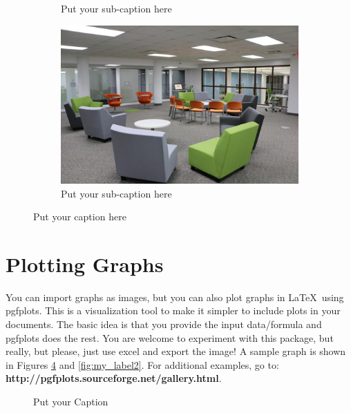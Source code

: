 \begin{figure}[ht]
\begin{subfigure}{.5\textwidth}
  \caption{Put your sub-caption here}
  \label{fig:sub-thirdthird}
\end{subfigure}
\begin{subfigure}{.5\textwidth}
  \centering
  \includegraphics[width=.8\linewidth]{images/2}  
  \caption{Put your sub-caption here}
  \label{fig:sub-fourthfourth}
\end{subfigure}
\caption{Put your caption here}
\label{fig:fig}
\end{figure}

\section{Plotting Graphs}

\noindent You can import graphs as images, but you can also plot graphs in \LaTeX\ using pgfplots. This is a visualization tool to make it simpler to include plots in your documents. The basic idea is that you provide the input data/formula and pgfplots does the rest. You are welcome to experiment with this package, but really, but please, just use excel and export the image! A sample graph is shown in Figures \ref{fig:my_label} and \ref{fig:my_label2}. For additional examples, go to: \textbf{http://pgfplots.sourceforge.net/gallery.html}.

\begin{figure}[!ht]
    \centering
    \caption{Put your Caption}
    \label{fig:my_label}
\end{figure}

